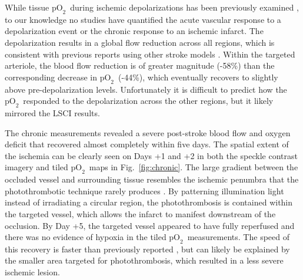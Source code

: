 \documentclass[12pt]{spieman}  %
\newcommand{\pO}{\ensuremath{\text{pO}_2}}
\begin{document}
\begin{spacing}{2}
While tissue \pO\ during ischemic depolarizations has been previously examined \cite{vonBornstadt:2015dj}, to our knowledge no studies have quantified the acute vascular response to a depolarization event or the chronic response to an ischemic infarct. The depolarization results in a global flow reduction across all regions, which is consistent with previous reports using other stroke models \cite{Shin:2006dc,Nakamura:2010wp}. Within the targeted arteriole, the blood flow reduction is of greater magnitude (-58\%) than the corresponding decrease in \pO\ (-44\%), which eventually recovers to slightly above pre-depolarization levels. Unfortunately it is difficult to predict how the \pO\ responded to the depolarization across the other regions, but it likely mirrored the LSCI results.

The chronic measurements revealed a severe post-stroke blood flow and oxygen deficit that recovered almost completely within five days. The spatial extent of the ischemia can be clearly seen on Days +1 and +2 in both the speckle contrast imagery and tiled \pO\ maps in Fig.~\ref{fig:chronic}. The large gradient between the occluded vessel and surrounding tissue resembles the ischemic penumbra that the photothrombotic technique rarely produces \cite{Carmichael:2005gk}. By patterning illumination light instead of irradiating a circular region, the photothrombosis is contained within the targeted vessel, which allows the infarct to manifest downstream of the occlusion. By Day +5, the targeted vessel appeared to have fully reperfused and there was no evidence of hypoxia in the tiled \pO\ measurements. The speed of this recovery is faster than previously reported \cite{Schrandt:2015gu}, but can likely be explained by the smaller area targeted for photothrombosis, which resulted in a less severe ischemic lesion.




\end{spacing}
\end{document}
